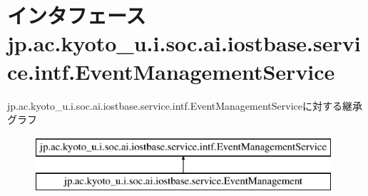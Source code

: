\hypertarget{interfacejp_1_1ac_1_1kyoto__u_1_1i_1_1soc_1_1ai_1_1iostbase_1_1service_1_1intf_1_1_event_management_service}{\section{インタフェース jp.\-ac.\-kyoto\-\_\-u.\-i.\-soc.\-ai.\-iostbase.\-service.\-intf.\-Event\-Management\-Service}
\label{interfacejp_1_1ac_1_1kyoto__u_1_1i_1_1soc_1_1ai_1_1iostbase_1_1service_1_1intf_1_1_event_management_service}
}
jp.\-ac.\-kyoto\-\_\-u.\-i.\-soc.\-ai.\-iostbase.\-service.\-intf.\-Event\-Management\-Serviceに対する継承グラフ\begin{figure}[H]
\begin{center}
\leavevmode
\includegraphics[height=2.000000cm]{interfacejp_1_1ac_1_1kyoto__u_1_1i_1_1soc_1_1ai_1_1iostbase_1_1service_1_1intf_1_1_event_management_service}
\end{center}
\end{figure}
